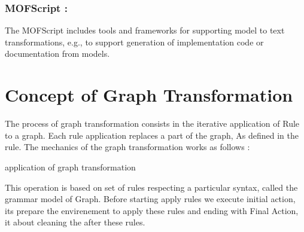 \subsubsection{MOFScript :} 
The MOFScript includes tools and frameworks for supporting model to text transformations, e.g., to support generation of implementation code or documentation from models\cite{ch3lang}.

\pagebreak


\section{Concept of Graph Transformation} 
The process of graph transformation consists in the iterative application of
Rule to a graph. Each rule application replaces a part of the graph, As defined in the rule. 
The mechanics of the graph transformation works as follows : 

\vspace{1cm}
\begin{algorithm}
\SetAlgoLined


 
 \caption{application of graph transformation}
\end{algorithm}

\vspace{0.5cm}
 
This operation is based on set of rules respecting a particular 
syntax, called the grammar model of Graph.
Before starting apply rules we execute initial action, 
its prepare the envirenement to apply these rules
and ending with Final Action, it about cleaning the after these rules\cite{ch3-bid, ch3-spec}.


